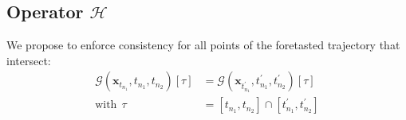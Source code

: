 \subsection{Operator $\mathcal{H}$}
\noindent We propose to enforce consistency for all points of the foretasted trajectory that intersect:
\begin{align}
    \mathcal{G}\left(\mathbf{x}_{t_{n_1}}, t_{n_1}, t_{n_2} \right)[\tau] & = \mathcal{G}\left(\mathbf{x}_{t_{n_1}^{'}}, t_{n_1}^{'}, t_{n_2}^{'} \right)[\tau] \\
    \text{with} \: \: \tau & = [t_{n_1}, t_{n_2}] \cap [t_{n_1}^{'}, t_{n_2}^{'}] \label{G:consistency}
\end{align}

